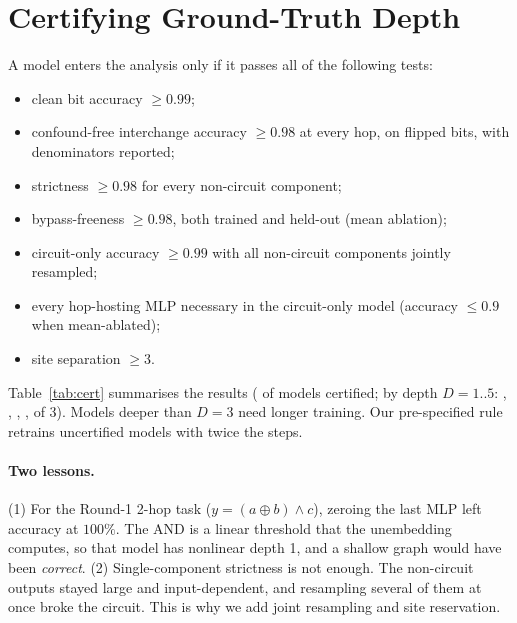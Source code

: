 \section{Certifying Ground-Truth Depth}\label{sec:gt}
A model enters the analysis only if it passes all of the following tests:
\begin{itemize}
\item clean bit accuracy $\ge 0.99$;
\item confound-free interchange accuracy $\ge 0.98$ at every hop, on flipped bits, with denominators reported;
\item strictness $\ge 0.98$ for every non-circuit component;
\item bypass-freeness $\ge 0.98$, both trained and held-out (mean ablation);
\item circuit-only accuracy $\ge 0.99$ with all non-circuit components jointly resampled;
\item every hop-hosting MLP necessary in the circuit-only model (accuracy $\le 0.9$ when mean-ablated);
\item site separation $\ge 3$.
\end{itemize}
Table~\ref{tab:cert} summarises the results (\NCertified{} of \NModels{} models certified; by depth $D=1..5$: \NCertOne, \NCertTwo, \NCertThree, \NCertFour, \NCertFive{} of 3). Models deeper than $D=3$ need longer training. Our pre-specified rule retrains uncertified models with twice the steps.
\paragraph{Two lessons.} (1) For the Round-1 2-hop task ($y=(a\oplus b)\wedge c$), zeroing the last MLP left accuracy at $100\%$. The AND is a linear threshold that the unembedding computes, so that model has nonlinear depth 1, and a shallow graph would have been \emph{correct}. (2) Single-component strictness is not enough. The non-circuit outputs stayed large and input-dependent, and resampling several of them at once broke the circuit. This is why we add joint resampling and site reservation.
\begin{table}[t]\centering\caption{Ground-truth certificates (pilot).}\label{tab:cert}\end{table}
